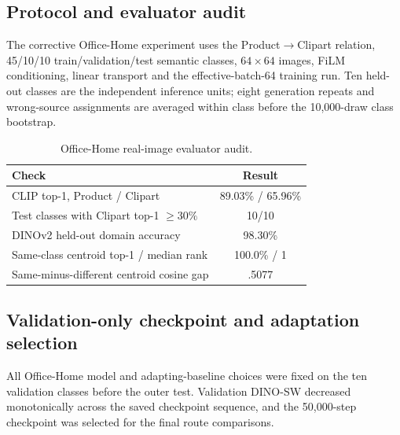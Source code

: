 \subsection{Protocol and evaluator audit}
The corrective Office-Home experiment uses the Product$\rightarrow$Clipart relation, 45/10/10 train/validation/test semantic classes, $64\times64$ images, FiLM conditioning, linear transport and the effective-batch-64 training run. Ten held-out classes are the independent inference units; eight generation repeats and wrong-source assignments are averaged within class before the 10,000-draw class bootstrap.

\begin{table}[h]
\centering\small
\caption{Office-Home real-image evaluator audit.}
\begin{tabular}{lc}
\toprule
Check & Result\\
\midrule
CLIP top-1, Product / Clipart & 89.03\% / 65.96\%\\
Test classes with Clipart top-1 $\geq30\%$ & 10/10\\
DINOv2 held-out domain accuracy & 98.30\%\\
Same-class centroid top-1 / median rank & 100.0\% / 1\\
Same-minus-different centroid cosine gap & .5077\\
\bottomrule
\end{tabular}
\end{table}


\subsection{Validation-only checkpoint and adaptation selection}

All Office-Home model and adapting-baseline choices were fixed on the ten validation classes before the outer test. Validation DINO-SW decreased monotonically across the saved checkpoint sequence, and the 50,000-step checkpoint was selected for the final route comparisons.


